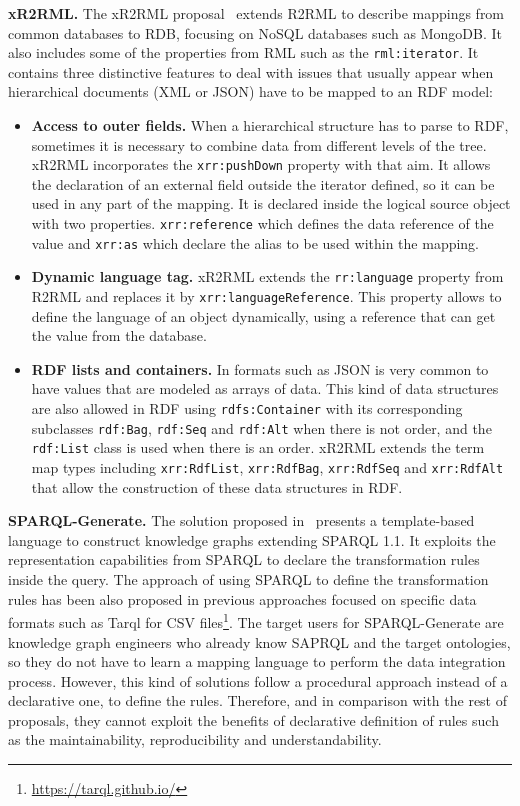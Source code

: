 \noindent\textbf{xR2RML.} The xR2RML proposal~\citep{michel2015translation} extends R2RML to describe mappings from common databases to RDB, focusing on NoSQL databases such as MongoDB. It also includes some of the properties from RML such as the \texttt{rml:iterator}. It contains three distinctive features to deal with issues that usually appear when hierarchical documents (XML or JSON) have to be mapped to an RDF model:
\begin{itemize}
    \item \textbf{Access to outer fields.} When a hierarchical structure has to parse to RDF, sometimes it is necessary to combine data from different levels of the tree. xR2RML incorporates the \texttt{xrr:pushDown} property with that aim. It allows the declaration of an external field outside the iterator defined, so it can be used in any part of the mapping. It is declared inside the logical source object with two properties. \texttt{xrr:reference} which defines the data reference of the value and \texttt{xrr:as} which declare the alias to be used within the mapping.  
    \item \textbf{Dynamic language tag.} xR2RML extends the \texttt{rr:language} property from R2RML and replaces it by \texttt{xrr:languageReference}. This property allows to define the language of an object dynamically, using a reference that can get the value from the database.
    \item \textbf{RDF lists and containers.} In formats such as JSON is very common to have values that are modeled as arrays of data. This kind of data structures are also allowed in RDF using \texttt{rdfs:Container} with its corresponding subclasses \texttt{rdf:Bag}, \texttt{rdf:Seq} and \texttt{rdf:Alt} when there is not order, and the \texttt{rdf:List} class is used when there is an order. xR2RML extends the term map types including \texttt{xrr:RdfList}, \texttt{xrr:RdfBag}, \texttt{xrr:RdfSeq} and \texttt{xrr:RdfAlt} that allow the construction of these data structures in RDF.
\end{itemize}

\noindent\textbf{SPARQL-Generate.} The solution proposed in~\citep{lefranccois2017sparql} presents a template-based language to construct knowledge graphs extending SPARQL 1.1. It exploits the representation capabilities from SPARQL to declare the transformation rules inside the query. The approach of using SPARQL to define the transformation rules has been also proposed in previous approaches focused on specific data formats such as Tarql for CSV files\footnote{\url{https://tarql.github.io/}}. The target users for SPARQL-Generate are knowledge graph engineers who already know SAPRQL and the target ontologies, so they do not have to learn a mapping language to perform the data integration process. However, this kind of solutions follow a procedural approach instead of a declarative one, to define the rules. Therefore, and in comparison with the rest of proposals, they cannot exploit the benefits of declarative definition of rules such as the maintainability, reproducibility and understandability.

